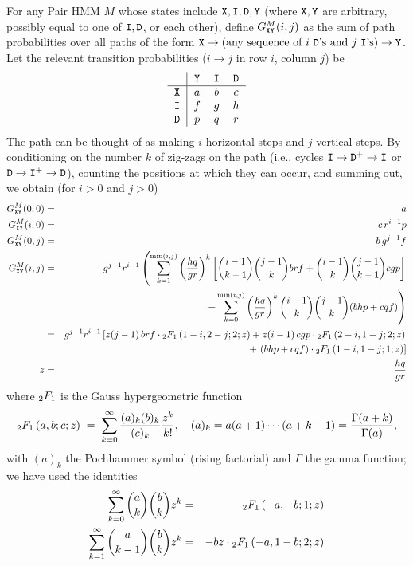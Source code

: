 For any Pair HMM $M$ whose states include ${\tt X}, {\tt I}, {\tt D}, {\tt Y}$ (where
${\tt X}, {\tt Y}$ are arbitrary, possibly equal to one of ${\tt I}, {\tt D}$, or each
other), define $G^M_{{\tt X}{\tt Y}}(i,j)$ as the sum of path probabilities
over all paths of the form ${\tt X} \to (\text{any sequence of $i$ ${\tt D}$'s and
$j$ ${\tt I}$'s}) \to {\tt Y}$.  Let the relevant transition probabilities
($i \to j$ in row $i$, column $j$) be
\[
\begin{tabular}{r|ccc}
  & \ystate & \ins & \del \\
\hline
\xstate & $a$ & $b$ & $c$ \\
\ins    & $f$ & $g$ & $h$ \\
\del    & $p$ & $q$ & $r$
\end{tabular}
\]
The path can be thought of as making $i$ horizontal steps and $j$ vertical steps.
By conditioning on the number $k$ of zig-zags on the path
(i.e., cycles ${\tt I} \to {\tt D}^+ \to {\tt I}$ or ${\tt D} \to {\tt I}^+ \to {\tt D}$),
counting the positions at which they can occur, and summing out, we obtain
(for $i > 0$ and $j > 0$)
\begin{eqnarray*}
G^M_{{\tt X}{\tt Y}}(0,0) & = & a \\
G^M_{{\tt X}{\tt Y}}(i,0) & = & c\,r^{i-1} p \\
G^M_{{\tt X}{\tt Y}}(0,j) & = & b\,g^{j-1} f \\
G^M_{{\tt X}{\tt Y}}(i,j) & = &
g^{j-1} r^{i-1}
\left(
\sum_{k=1}^{\min(i,j)}
\left(\frac{hq}{gr}\right)^k
\left[
\binom{i-1}{k-1} \binom{j-1}{k} brf
+ \binom{i-1}{k} \binom{j-1}{k-1} cgp
\right]
\right. \\ & & \quad \quad \quad \quad \quad \quad \left.
+ \sum_{k=0}^{\min(i,j)}
\left(\frac{hq}{gr}\right)^k
\binom{i-1}{k} \binom{j-1}{k} (bhp+cqf)
\right)
\\ & = &
g^{j-1} r^{i-1} \left[
  z(j-1)\,brf \cdot {}_{2} F_{1} \left( 1-i,2-j; 2; z \right)
+ z(i-1)\,cgp \cdot {}_{2} F_{1} \left( 2-i,1-j; 2; z \right)
\right. \\ & & \quad \quad \quad \quad \quad \quad \left.
+\ (bhp+cqf) \cdot {}_{2} F_{1} \left( 1-i,1-j; 1; z \right)
\right]
 \\
z & = & \frac{hq}{gr}
\end{eqnarray*}
where ${}_{2} F_{1}$ is the Gauss hypergeometric function
\[
  {}_{2} F_{1} \left( a,b; c; z \right)
   \;=\; \sum_{k=0}^\infty \frac{(a)_k (b)_k}{(c)_k} \frac{z^k}{k!},
   \quad
   (a)_k = a(a+1)\cdots(a+k-1) = \frac{\Gamma(a+k)}{\Gamma(a)},
\]
with $(a)_k$ the Pochhammer symbol (rising factorial) and $\Gamma$ the gamma
function; we have used the identities
\begin{eqnarray*}
  \sum_{k=0}^{\infty} \binom{a}{k} \binom{b}{k} z^k
  & = & {}_{2} F_{1} \left( -a,-b; 1; z \right) \\
  \sum_{k=1}^{\infty} \binom{a}{k-1} \binom{b}{k} z^k
  & = & -bz \cdot {}_{2} F_{1} \left( -a,1-b; 2; z \right)
\end{eqnarray*}

